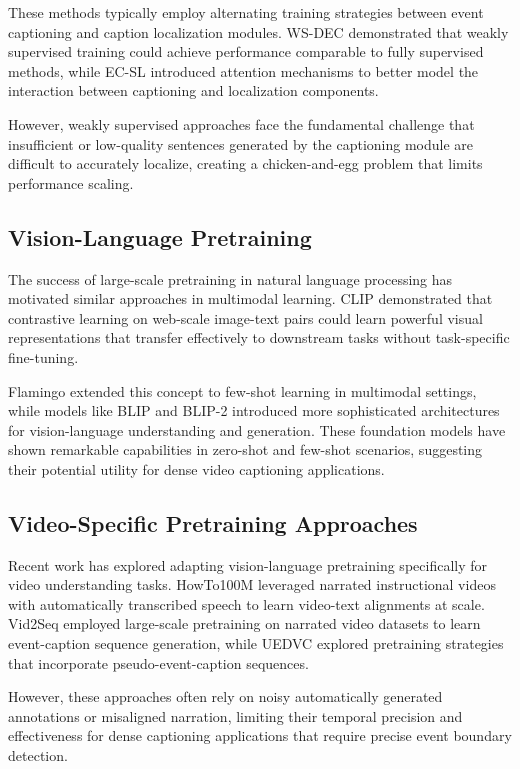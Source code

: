 These methods typically employ alternating training strategies between event captioning and caption localization modules.
WS-DEC \cite{Duan2018-qf} demonstrated that weakly supervised training could achieve performance comparable to fully supervised methods, while EC-SL \cite{Chen2021-sv} introduced attention mechanisms to better model the interaction between captioning and localization components.

However, weakly supervised approaches face the fundamental challenge that insufficient or low-quality sentences generated by the captioning module are difficult to accurately localize, creating a chicken-and-egg problem that limits performance scaling.

\subsection{Vision-Language Pretraining}
The success of large-scale pretraining in natural language processing has motivated similar approaches in multimodal learning.
CLIP \cite{Radford2021-kx} demonstrated that contrastive learning on web-scale image-text pairs could learn powerful visual representations that transfer effectively to downstream tasks without task-specific fine-tuning.

Flamingo \cite{Alayrac2022-ac} extended this concept to few-shot learning in multimodal settings, while models like BLIP \cite{Li2023-blip} and BLIP-2 \cite{Li2023-blip2} introduced more sophisticated architectures for vision-language understanding and generation.
These foundation models have shown remarkable capabilities in zero-shot and few-shot scenarios, suggesting their potential utility for dense video captioning applications.

\subsection{Video-Specific Pretraining Approaches}
Recent work has explored adapting vision-language pretraining specifically for video understanding tasks.
HowTo100M \cite{Miech2019-hk} leveraged narrated instructional videos with automatically transcribed speech to learn video-text alignments at scale.
Vid2Seq \cite{Yang2023-fm} employed large-scale pretraining on narrated video datasets to learn event-caption sequence generation, while UEDVC \cite{Zhang2022-ni} explored pretraining strategies that incorporate pseudo-event-caption sequences.

However, these approaches often rely on noisy automatically generated annotations or misaligned narration, limiting their temporal precision and effectiveness for dense captioning applications that require precise event boundary detection.

